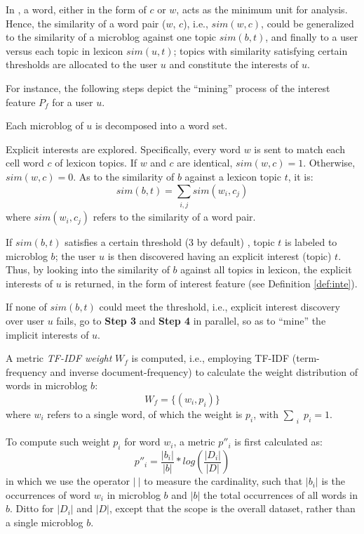 In \sys{}, a word, either in the form of $c$ or $w$, acts as the minimum unit for analysis.
Hence, the similarity of a word pair ($w$, $c$), i.e., $sim(w, c)$, could be generalized to the similarity of a microblog against one topic $sim(b, t)$, and finally to a user versus each topic in lexicon $sim(u, t)$; topics with similarity satisfying certain thresholds are allocated to the user $u$ and constitute the interests of $u$.

For instance, the following steps depict the ``mining'' process of the interest feature $P_f$ for a user $u$.

 Each microblog of $u$ is decomposed into a word set. %

 Explicit interests are explored. Specifically, every word $w$ is sent to match each cell word $c$ of lexicon topics.
If $w$ and $c$ are identical, $sim(w, c) = 1$.
Otherwise, $sim(w, c) = 0$.
As to the similarity of $b$ against a lexicon topic $t$, it is:
\begin{equation}
\label{eq:bt}
sim(b, t) = \sum_{\substack{i, j}} sim(w_i, c_j)
\end{equation}
where $sim(w_i, c_j)$ refers to the similarity of a word pair.

If $sim(b, t)$ satisfies a certain threshold (3 by default) , topic $t$ is labeled to microblog $b$;
the user $u$ is then discovered having an explicit interest (topic) $t$.
Thus, by looking into the similarity of $b$ against all topics in lexicon, the explicit interests of $u$ is returned, in the form of interest feature (see Definition \ref{def:inte}).

If none of $sim(b, t)$ could meet the threshold, i.e., explicit interest discovery over user $u$ fails, go to \textbf{Step 3} and \textbf{Step 4} in parallel, so as to ``mine'' the implicit interests of $u$.

 A metric \textit{TF-IDF weight} $W_f$ is computed, i.e., employing TF-IDF (term-frequency and inverse document-frequency) to calculate the weight distribution of words in microblog $b$:
\begin{equation}
\label{eq:tf}
W_f = \{(w_i, p_i)\}
\end{equation}
where $w_i$ refers to a single word, of which the weight is $p_i$, with $\sum_{\substack{i}} p_i = 1$.

To compute such weight $p_i$ for word $w_i$, a metric $p''_i$ is first calculated as:
\begin{equation}
\label{eq:tf-w}
p''_i = \frac{|b_i|}{|b|} * log(\frac{|D_i|}{|D|})
\end{equation}
in which we use the operator $|\ |$ to measure the cardinality, such that $|b_i|$ is the occurrences of word $w_i$ in microblog $b$ and $|b|$ the total occurrences of all words in $b$.
Ditto for $|D_i|$ and $|D|$, except that the scope is the overall dataset, rather than a single microblog $b$.

